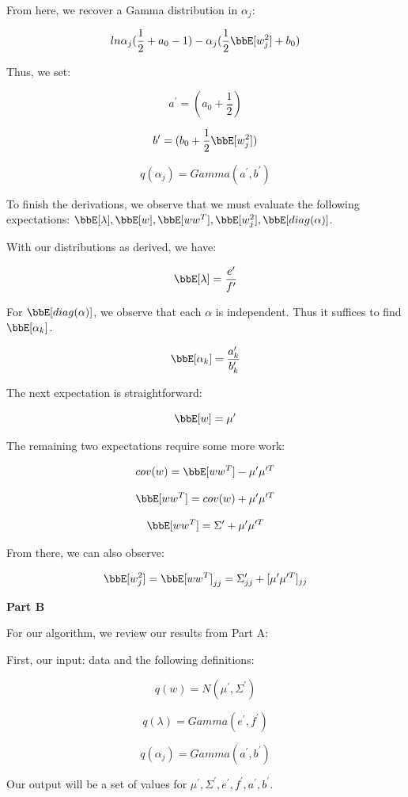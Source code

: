 \documentclass[twoside,11pt]{homework}
\begin{document}
From here, we recover a Gamma distribution in $\alpha_j$:

\[
 ln\alpha_j (\frac{1}{2} + a_0 - 1)
 - \alpha_j(\frac{1}{2}\bbE[w_j^2] + b_0)
\]

Thus, we set:

\[
a^\prime = (a_0 + \frac{1}{2})
\]

\[
b^\prime = (b_0 + \frac{1}{2}\bbE[w_j^2])
\]

\begin{equation}
q(\alpha_j) = Gamma(a^\prime, b^\prime)
\end{equation}

To finish the derivations, we observe that we must evaluate the following expectations:
$\bbE[\lambda], \bbE[w], \bbE[ww^T], \bbE[w_j^2], \bbE[diag(\alpha)]$.

With our distributions as derived, we have:

\[
\bbE[\lambda] = \frac{e^\prime}{f^\prime}
\]

For $\bbE[diag(\alpha)]$, we observe that each $\alpha$ is independent. Thus it suffices to find $\bbE[\alpha_k]$.

\[
\bbE[\alpha_k] = \frac{a^\prime_k}{b^\prime_k}
\]

The next expectation is straightforward:

\[
\bbE[w] = \mu^\prime
\]

The remaining two expectations require some more work:

\[
cov(w) = \bbE[ww^T] - \mu^\prime \mu^{\prime T}
\]

\[
\bbE[ww^T] = cov(w) + \mu^\prime \mu^{\prime T}
\]

\[
\bbE[ww^T] = \Sigma^\prime + \mu^\prime \mu^{\prime T}
\]

From there, we can also observe:

\[
\bbE[w_j^2] = \bbE[ww^T] _{jj} = \Sigma^\prime_{jj} + [\mu^\prime \mu^{\prime T}]_{jj}
\]


\textbf{Part B}

For our algorithm, we review our results from Part A:

First, our input: data and the following definitions:

\[
q(w) = N(\mu^\prime, \Sigma^\prime)
\]

\[
q(\lambda) = Gamma(e^\prime, f^\prime)
\]

\[
q(\alpha_j) = Gamma(a^\prime, b^\prime)
\]

Our output will be a set of values for $\mu^\prime, \Sigma^\prime, e^\prime, f^\prime, a^\prime, b^\prime$.
\end{document}
